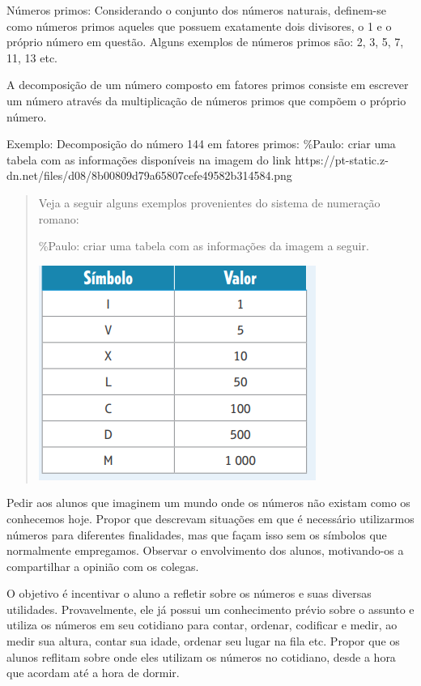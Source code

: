 Números primos: Considerando o conjunto dos números naturais, definem-se
como números primos aqueles que possuem exatamente dois divisores, o 1 e
o próprio número em questão. Alguns exemplos de números primos são: 2,
3, 5, 7, 11, 13 etc.

A decomposição de um número composto em fatores primos consiste em
escrever um número através da multiplicação de números primos que
compõem o próprio número.

Exemplo: Decomposição do número 144 em fatores primos: \%Paulo: criar
uma tabela com as informações disponíveis na imagem do link
https://pt-static.z-dn.net/files/d08/8b00809d79a65807cefe49582b314584.png

\begin{quote}
Veja a seguir alguns exemplos provenientes do sistema de numeração
romano:

\%Paulo: criar uma tabela com as informações da imagem a seguir.

\includegraphics[width=3.5625in,height=2.76042in]{./imgSAEB_6_MAT/media/image5.png}
\end{quote}

Pedir aos alunos que imaginem um mundo onde os números não existam como
os conhecemos hoje. Propor que descrevam situações em que é necessário
utilizarmos números para diferentes finalidades, mas que façam isso sem
os símbolos que normalmente empregamos. Observar o envolvimento dos
alunos, motivando-os a compartilhar a opinião com os colegas.

O objetivo é incentivar o aluno a refletir sobre os números e suas
diversas utilidades. Provavelmente, ele já possui um conhecimento prévio
sobre o assunto e utiliza os números em seu cotidiano para contar,
ordenar, codificar e medir, ao medir sua altura, contar sua idade,
ordenar seu lugar na fila etc. Propor que os alunos reflitam sobre onde
eles utilizam os números no cotidiano, desde a hora que acordam até a
hora de dormir.

